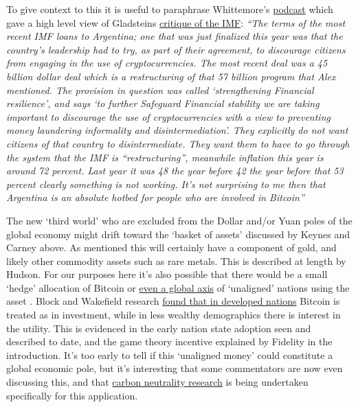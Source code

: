 To give context to this it is useful to paraphrase Whittemore's \href{https://www.youtube.com/watch?v=LOqQSKbfRu4}{podcast} which gave a high level view of Gladsteins \href{https://bitcoinmagazine.com/culture/imf-world-bank-repress-poor-countries}{critique of the IMF}: \textit{``The terms of the most recent IMF loans to Argentina; one that was just finalized this year was that the country's leadership had to try, as part of their agreement, to discourage citizens from engaging in the use of cryptocurrencies. The most recent deal was a 45 billion dollar deal which is a restructuring of that 57 billion program that Alex mentioned. The provision in question was called `strengthening Financial resilience', and says `to further Safeguard Financial stability we are taking important to discourage the use of cryptocurrencies with a view to preventing money laundering informality and disintermediation'. They explicitly do not want citizens of that country to disintermediate. They want them to have to go through the system that the IMF is ``restructuring'', meanwhile inflation this
year is around 72 percent. Last year it was 48 the year before 42 the year before that 53 percent clearly something is not working. It's not surprising to me then that Argentina is an absolute hotbed for people who are involved in
Bitcoin''} \par
The new `third world' who are excluded from the Dollar and/or Yuan poles of the global economy might drift toward the `basket of assets' discussed by Keynes and Carney above. As mentioned this will certainly have a component of gold, and likely other commodity assets such as rare metals. This is described at length by Hudson\cite{hudson2021destiny}. For our purposes here it's also possible that there would be a small `hedge' allocation of Bitcoin or \href{https://www.independent.co.uk/tech/bitcoin-el-salvador-crypto-btc-b2079881.html}{even a global axis} of `unaligned' nations using the asset \cite{hendrickson2021value, ferranti2022hedging}. Block and Wakefield research \href{https://block.xyz/2022/btc-report.pdf}{found that in developed nations} Bitcoin is treated as in investment, while in less wealthy demographics there is interest in the utility. This is evidenced in the early nation state adoption seen and described to date, and the game theory incentive explained by Fidelity in the introduction. It's too early to tell if this `unaligned money' could constitute a global economic pole, but it's interesting that some commentators are now even discussing this, and that \href{https://docs.google.com/document/d/1Ynl5bbdTqev-wbTAWQoeWdh1cJVf3ortuSjre9K9wGQ/edit}{carbon neutrality research} is being undertaken specifically for this application.

